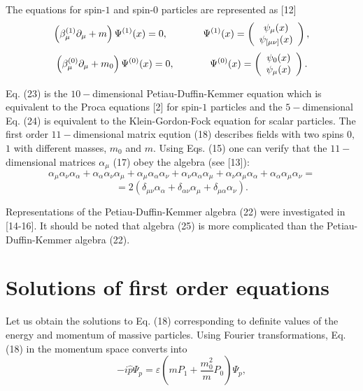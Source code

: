 \documentclass[a4paper,12pt]{article}
\begin{document}
The equations for spin-$1$ and spin-$0$ particles are represented
as [12]
\begin{equation}
\left( \beta _\mu ^{(1)}\partial _\mu +m\right) \Psi ^{(1)}(x)=0,
\hspace{0.5in}\Psi ^{(1)}(x)=\left(
\begin{array}{c}
\psi_\mu (x)\\
\psi_{[\mu \nu ]}(x)
\end{array}
\right),  \label{23}
\end{equation}
\begin{equation}
\left( \beta _\mu ^{(0)}\partial _\mu +m_0\right) \Psi
^{(0)}(x)=0, \hspace{0.5in}\Psi ^{(0)}(x)=\left(
\begin{array}{c}
\psi_0 (x)\\
\psi_\mu (x)
\end{array}
\right).  \label{24}
\end{equation}

Eq. (23) is the $10-$dimensional Petiau-Duffin-Kemmer equation
which is equivalent to the Proca equations [2] for spin-$1$
particles and the $5-$dimensional Eq. (24) is equivalent to the
Klein-Gordon-Fock equation for scalar particles. The first order
$11-$dimensional matrix eqution (18) describes fields with two
spins $0,$ $1$ with different masses, $m_0$ and $m$. Using Eqs.
(15) one can verify that the $11-$dimensional matrices $\alpha
_\mu $ (17) obey the algebra (see [13]):
\[
\alpha _\mu \alpha _\nu \alpha _\alpha +\alpha _\alpha \alpha _\nu
\alpha _\mu +\alpha _\mu \alpha _\alpha \alpha _\nu +\alpha _\nu
\alpha _\alpha \alpha _\mu +\alpha _\nu \alpha _\mu \alpha _\alpha
+\alpha _\alpha \alpha _\mu \alpha _\nu =
\]
\begin{equation}
=2\left( \delta _{\mu \nu }\alpha _\alpha +\delta _{\alpha \nu
}\alpha _\mu +\delta _{\mu \alpha }\alpha _\nu \right). \label{25}
\end{equation}

Representations of the Petiau-Duffin-Kemmer algebra (22) were
investigated in [14-16]. It should be noted that algebra (25) is
more complicated than the Petiau-Duffin-Kemmer algebra (22).

\section{Solutions of first order equations}

Let us obtain the solutions to Eq. (18) corresponding to definite
values of the energy and momentum of massive particles. Using
Fourier transformations, Eq. (18) in the momentum space converts
into
\begin{equation}
-i\widehat{p}\Psi _p=\varepsilon \left(
mP_1+\frac{m_0^2}{m}P_0\right)\Psi _p, \label{26}
\end{equation}
\end{document}
